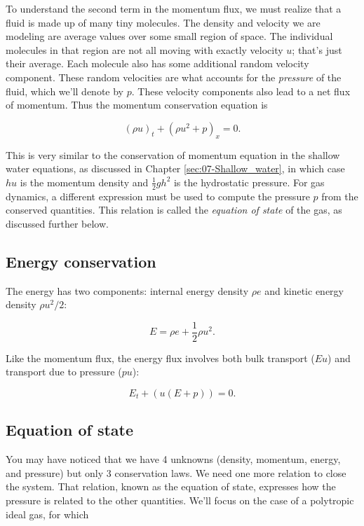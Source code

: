 \documentclass{SIAMbook2016}
\begin{document}
To understand the second term in the momentum flux, we must realize that
a fluid is made up of many tiny molecules. The density and velocity we
are modeling are average values over some small region of space. The
individual molecules in that region are not all moving with exactly
velocity \(u\); that's just their average. Each molecule also has some
additional random velocity component. These random velocities are what
accounts for the \emph{pressure} of the fluid, which we'll denote by
\(p\). These velocity components also lead to a net flux of momentum.
Thus the momentum conservation equation is

\[(\rho u)_t + (\rho u^2 + p)_x = 0.\]

This is very similar to the conservation of momentum equation in the
shallow water equations, as discussed in
Chapter \ref{sec:07-Shallow_water}, in which case \(hu\) is the momentum
density and \(\frac 1 2 gh^2\) is the hydrostatic pressure. For gas
dynamics, a different expression must be used to compute the pressure
\(p\) from the conserved quantities. This relation is called the
\emph{equation of state} of the gas, as discussed further below.

\hypertarget{energy-conservation}{%
\subsection{Energy conservation}\label{energy-conservation}}

The energy has two components: internal energy density \(\rho e\) and
kinetic energy density \(\rho u^2/2\):

\[E = \rho e + \frac{1}{2}\rho u^2.\]

Like the momentum flux, the energy flux involves both bulk transport
(\(Eu\)) and transport due to pressure (\(pu\)):

\[E_t + (u(E+p)) = 0.\]

\hypertarget{equation-of-state}{%
\subsection{Equation of state}\label{equation-of-state}}

You may have noticed that we have 4 unknowns (density, momentum, energy,
and pressure) but only 3 conservation laws. We need one more relation to
close the system. That relation, known as the equation of state,
expresses how the pressure is related to the other quantities. We'll
focus on the case of a polytropic ideal gas, for which
\end{document}
